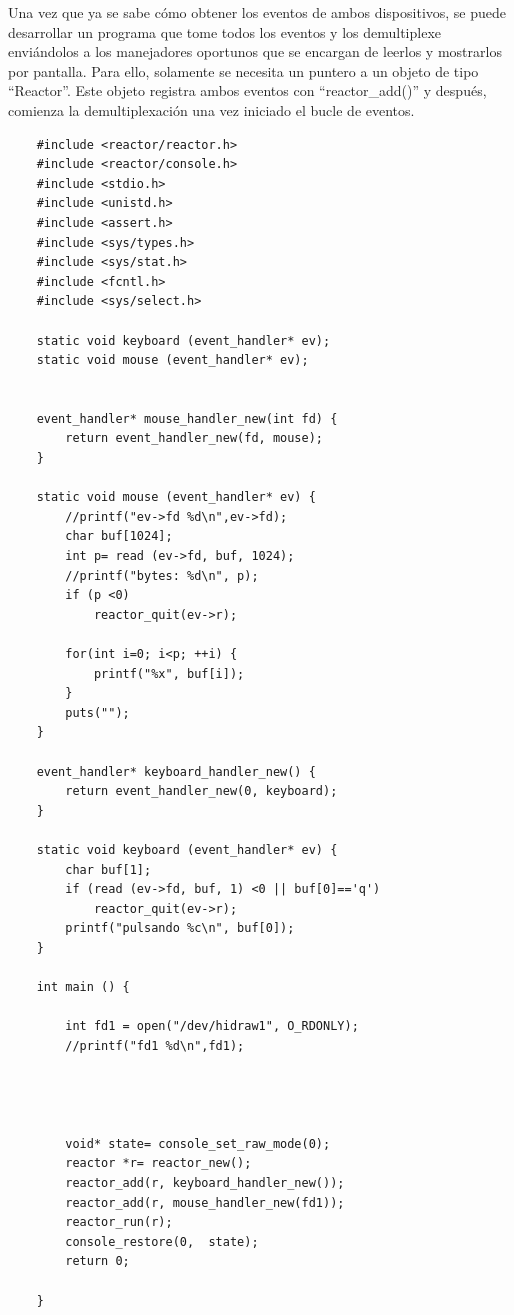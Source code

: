 Una vez que ya se sabe cómo obtener los eventos de ambos dispositivos, se puede desarrollar un programa que tome todos los eventos y los demultiplexe enviándolos a los manejadores oportunos que se encargan de leerlos y mostrarlos por pantalla. Para ello, solamente se necesita un puntero a un objeto de tipo ``Reactor''. Este objeto registra ambos eventos con ``reactor\_add()'' y después, comienza la demultiplexación una vez iniciado el bucle de eventos. \\

\begin{verbatim}
    #include <reactor/reactor.h>
    #include <reactor/console.h>
    #include <stdio.h>
    #include <unistd.h>
    #include <assert.h>
    #include <sys/types.h>
    #include <sys/stat.h>
    #include <fcntl.h>
    #include <sys/select.h>
    
    static void keyboard (event_handler* ev);
    static void mouse (event_handler* ev);
    
    
    event_handler* mouse_handler_new(int fd) {
    	return event_handler_new(fd, mouse);
    }
    
    static void mouse (event_handler* ev) {
    	//printf("ev->fd %d\n",ev->fd);
    	char buf[1024];
    	int p= read (ev->fd, buf, 1024);
    	//printf("bytes: %d\n", p);
    	if (p <0)
    		reactor_quit(ev->r);
    		
    	for(int i=0; i<p; ++i) {
    		printf("%x", buf[i]);
    	}
    	puts("");
    }
    
    event_handler* keyboard_handler_new() {
    	return event_handler_new(0, keyboard);
    }
    
    static void keyboard (event_handler* ev) {
    	char buf[1];
    	if (read (ev->fd, buf, 1) <0 || buf[0]=='q')
    		reactor_quit(ev->r);
    	printf("pulsando %c\n", buf[0]);
    }
    
    int main () {
    	
    	int fd1 = open("/dev/hidraw1", O_RDONLY);
    	//printf("fd1 %d\n",fd1);
    	
    	
    	
    	
    	void* state= console_set_raw_mode(0);
    	reactor *r= reactor_new();
    	reactor_add(r, keyboard_handler_new());
    	reactor_add(r, mouse_handler_new(fd1));
    	reactor_run(r);
    	console_restore(0,  state);
    	return 0;
    	
    }


    \end{verbatim}


